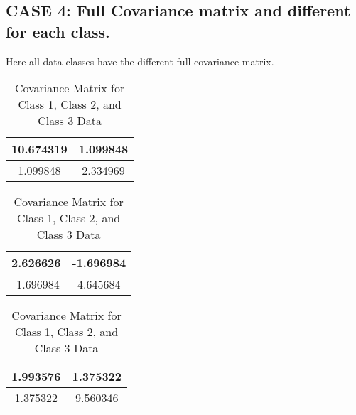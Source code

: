 \subsection{CASE 4: Full Covariance matrix and different for each class.}
Here all data classes have the different full covariance matrix.\\

\begin{table}[H]
    \caption{Covariance Matrix for Class 1, Class 2, and Class 3 Data}
    \begin{minipage}{0.37\textwidth}
        \centering
    
        \begin{tabular}{|c|c|}
        \hline
        10.674319 & 1.099848 \\
        \hline 
        1.099848 & 2.334969 \\
        \hline
        \end{tabular}
    \end{minipage}%
    \begin{minipage}{0.37\textwidth}
        \begin{tabular}{|c|c|}
        \hline
        2.626626 & -1.696984 \\
        \hline 
        -1.696984 & 4.645684 \\
        \hline
        \end{tabular}
    \end{minipage}%
    \begin{minipage}{0.37\textwidth}
        \begin{tabular}{|c|c|}
        \hline
        1.993576 & 1.375322 \\
        \hline 
        1.375322 & 9.560346 \\
        \hline
        \end{tabular}
    \end{minipage}
\label{tab:arch29}
\end{table}



